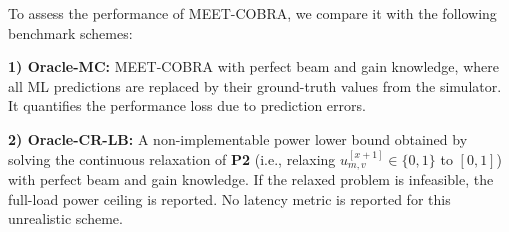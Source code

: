 \documentclass[conference, a4paper]{IEEEtran}
\theoremstyle{remark}
\begin{document}
To assess the performance of MEET-COBRA, we compare it with the following benchmark schemes:


\textbf{1) Oracle-MC:} MEET-COBRA with perfect beam and gain knowledge, where all ML predictions are replaced by their ground-truth values from the simulator. It quantifies the performance loss due to prediction errors.

\textbf{2) Oracle-CR-LB:} A non-implementable power lower bound obtained by solving the continuous relaxation of \textbf{P2} (i.e., relaxing $u^{[x+1]}_{m,v}\in\{0,1\}$ to $[0,1]$) with perfect beam and gain knowledge. If the relaxed problem is infeasible, the full-load power ceiling is reported. No latency metric is reported for this unrealistic scheme.
\end{document}
